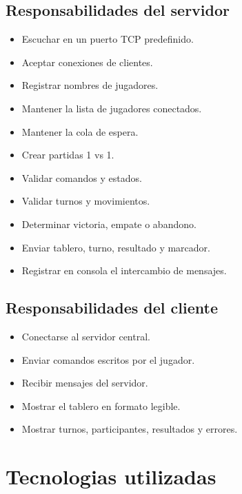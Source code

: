 \documentclass[12pt,a4paper]{article}
\begin{document}
\subsection{Responsabilidades del servidor}

\begin{itemize}
    \item Escuchar en un puerto TCP predefinido.
    \item Aceptar conexiones de clientes.
    \item Registrar nombres de jugadores.
    \item Mantener la lista de jugadores conectados.
    \item Mantener la cola de espera.
    \item Crear partidas 1 vs 1.
    \item Validar comandos y estados.
    \item Validar turnos y movimientos.
    \item Determinar victoria, empate o abandono.
    \item Enviar tablero, turno, resultado y marcador.
    \item Registrar en consola el intercambio de mensajes.
\end{itemize}

\subsection{Responsabilidades del cliente}

\begin{itemize}
    \item Conectarse al servidor central.
    \item Enviar comandos escritos por el jugador.
    \item Recibir mensajes del servidor.
    \item Mostrar el tablero en formato legible.
    \item Mostrar turnos, participantes, resultados y errores.
\end{itemize}

\section{Tecnologias utilizadas}
\end{document}
